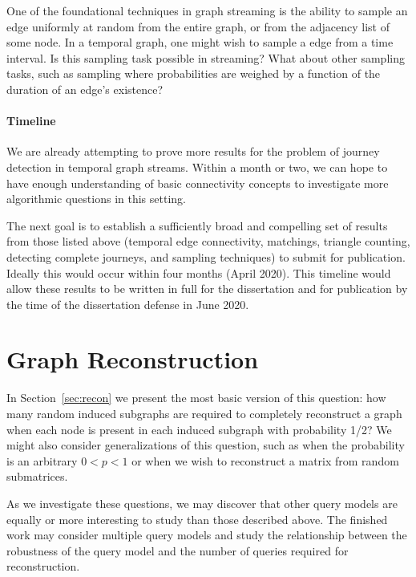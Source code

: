 One of the foundational techniques in graph streaming is the ability to sample an edge uniformly at random from the entire graph, or from the adjacency list of some node.  In a temporal graph, one might wish to sample a edge from a time interval.  Is this sampling task possible in streaming?  What about other sampling tasks, such as sampling where probabilities are weighed by a function of the duration of an edge's existence?


\paragraph*{Timeline}
We are already attempting to prove more results for the problem of journey detection in temporal graph streams.  Within a month or two, we can hope to have enough understanding of basic connectivity concepts to investigate more algorithmic questions in this setting.

The next goal is to establish a sufficiently broad and compelling set of results from those listed above (temporal edge connectivity, matchings, triangle counting, detecting complete journeys, and sampling techniques) to submit for publication.  Ideally this would occur within four months (April 2020).  This timeline would allow these results to be written in full for the dissertation and for publication by the time of the dissertation defense in June 2020.


\section{Graph Reconstruction}
In Section~\ref{sec:recon} we present the most basic version of this question: how many random induced subgraphs are required to completely reconstruct a graph when each node is present in each induced subgraph with probability 1/2?  We might also consider generalizations of this question, such as when the probability is an arbitrary $0 < p < 1$ or when we wish to reconstruct a matrix from random submatrices.

As we investigate these questions, we may discover that other query models are equally or more interesting to study than those described above.  The finished work may consider multiple query models and study the relationship between the robustness of the query model and the number of queries required for reconstruction.

